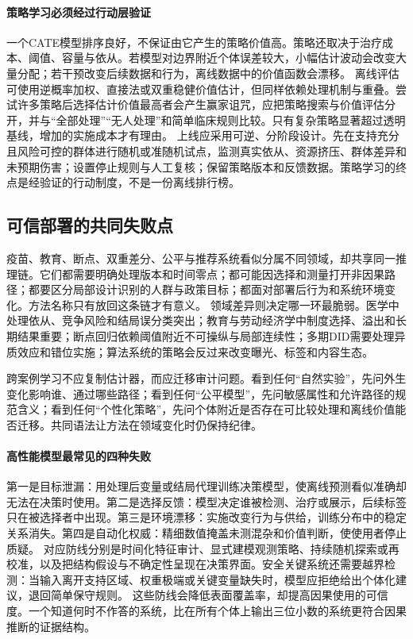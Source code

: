 \paragraph{策略学习必须经过行动层验证}

一个CATE模型排序良好，不保证由它产生的策略价值高。策略还取决于治疗成本、阈值、容量与依从。若模型对边界附近个体误差较大，小幅估计波动会改变大量分配；若干预改变后续数据和行为，离线数据中的价值函数会漂移。
离线评估可使用逆概率加权、直接法或双重稳健价值估计，但同样依赖处理机制与重叠。尝试许多策略后选择估计价值最高者会产生赢家诅咒，应把策略搜索与价值评估分开，并与“全部处理”“无人处理”和简单临床规则比较。只有复杂策略显著超过透明基线，增加的实施成本才有理由。
上线应采用可逆、分阶段设计。先在支持充分且风险可控的群体进行随机或准随机试点，监测真实依从、资源挤压、群体差异和未预期伤害；设置停止规则与人工复核；保留策略版本和反馈数据。策略学习的终点是经验证的行动制度，不是一份离线排行榜。

\subsection{可信部署的共同失败点}

疫苗、教育、断点、双重差分、公平与推荐系统看似分属不同领域，却共享同一推理链。它们都需要明确处理版本和时间零点；都可能因选择和测量打开非因果路径；都要区分局部设计识别的人群与政策目标；都面对部署后行为和系统环境变化。方法名称只有放回这条链才有意义。
领域差异则决定哪一环最脆弱。医学中处理依从、竞争风险和结局误分类突出；教育与劳动经济学中制度选择、溢出和长期结果重要；断点回归依赖阈值附近不可操纵与局部连续性；多期DID需要处理异质效应和错位实施；算法系统的策略会反过来改变曝光、标签和内容生态。

跨案例学习不应复制估计器，而应迁移审计问题。看到任何“自然实验”，先问外生变化影响谁、通过哪些路径；看到任何“公平模型”，先问敏感属性和允许路径的规范含义；看到任何“个性化策略”，先问个体附近是否存在可比较处理和离线价值能否迁移。共同语法让方法在领域变化时仍保持纪律。

\paragraph{高性能模型最常见的四种失败}

第一是目标泄漏：用处理后变量或结局代理训练决策模型，使离线预测看似准确却无法在决策时使用。第二是选择反馈：模型决定谁被检测、治疗或展示，后续标签只在被选择者中出现。第三是环境漂移：实施改变行为与供给，训练分布中的稳定关系消失。第四是自动化权威：精细数值掩盖未测混杂和价值判断，使使用者停止质疑。
对应防线分别是时间化特征审计、显式建模观测策略、持续随机探索或再校准，以及把结构假设与不确定性呈现在决策界面。安全关键系统还需要越界检测：当输入离开支持区域、权重极端或关键变量缺失时，模型应拒绝给出个体化建议，退回简单保守规则。
这些防线会降低表面覆盖率，却提高因果使用的可信度。一个知道何时不作答的系统，比在所有个体上输出三位小数的系统更符合因果推断的证据结构。

